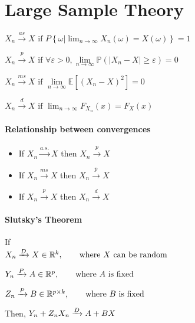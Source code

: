 \section{Large Sample Theory}

$X_n \stackrel{a s}{\longrightarrow} X \text { if } P \left\{\omega | \lim _{n \rightarrow \infty} X_n(\omega)=X(\omega)\right\}=1$

$X_n \stackrel{p}{\longrightarrow} X \text { if } \forall \varepsilon>0, \lim\limits_{n\rightarrow \infty} \mathbb{P}(|X_n-X|\geq\varepsilon)=0$

$X_n \stackrel{ms}{\longrightarrow} X \text { if } \lim\limits_{n\rightarrow \infty} \mathbb{E}\left[(X_n - X)^2\right]=0$

$X_n \stackrel{d}{\rightarrow} X \text { if } \lim _{n \rightarrow \infty} F_{X_n}(x)=F_X(x)$

\paragraph{Relationship between convergences}

\begin{itemize}
    \item If $X_n \stackrel{a.s.}{\longrightarrow} X$ then $X_n \stackrel{p}{\longrightarrow} X$
    \item If $X_n \stackrel{ms}{\longrightarrow} X$ then $X_n \stackrel{p}{\longrightarrow} X$
    \item If $X_n \stackrel{p}{\longrightarrow} X$ then $X_n \stackrel{d}{\longrightarrow} X$
\end{itemize}

\paragraph{Slutsky's Theorem}

If \\

$X_n \xrightarrow[]{%
		\substack{D}
	} X \in \mathbb{R}^k, \qquad \text{where $X$ can be random}$

$Y_n \xrightarrow[]{%
		\substack{P}
	} A \in \mathbb{R}^p, \qquad \text{where $A$ is fixed}$

$Z_n \xrightarrow[]{%
		\substack{P}
	} B \in \mathbb{R}^{p \times k}, \qquad \text{where $B$ is fixed}$

Then, $Y_n + Z_n X_n \xrightarrow[]{%
		\substack{D}
	} A + BX$



